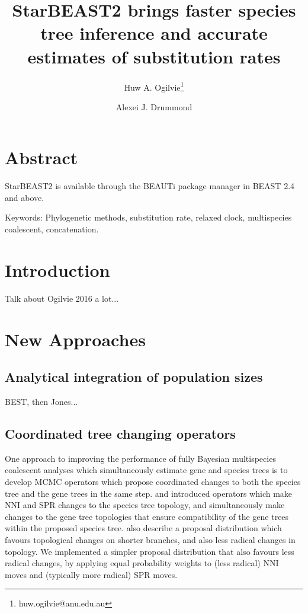 \documentclass[12pt]{article}
\begin{document}
\title{StarBEAST2 brings faster species tree inference and accurate estimates of substitution rates}
\author[1,2]{Huw A. Ogilvie\thanks{huw.ogilvie@anu.edu.au}}
\author[2,3]{Alexei J. Drummond}

\maketitle

\clearpage

\justifying

\section{Abstract}

StarBEAST2 is available through the BEAUTi package manager in BEAST 2.4 and above.

Keywords: Phylogenetic methods, substitution rate, relaxed clock, multispecies coalescent, concatenation.

\section{Introduction}

Talk about Ogilvie 2016 a lot...

\section{New Approaches}

\subsection{Analytical integration of population sizes}

BEST, then Jones...

\subsection{Coordinated tree changing operators}

One approach to improving the performance of fully Bayesian multispecies
coalescent analyses which simultaneously estimate gene and species trees is to
develop MCMC operators which propose coordinated changes to both the species
tree and the gene trees in the same step. \cite{Yang01122014} and
\cite{2015arXiv151203843R} introduced operators which make NNI and SPR changes
to the species tree topology, and simultaneously make changes to the gene tree
topologies that ensure compatibility of the gene trees within the proposed
species tree. \cite{2015arXiv151203843R} also describe a proposal distribution
which favours topological changes on shorter branches, and also less radical
changes in topology. We implemented a simpler proposal distribution that also
favours less radical changes, by applying equal probability weights to (less
radical) NNI moves and (typically more radical) SPR moves.
\end{document}
